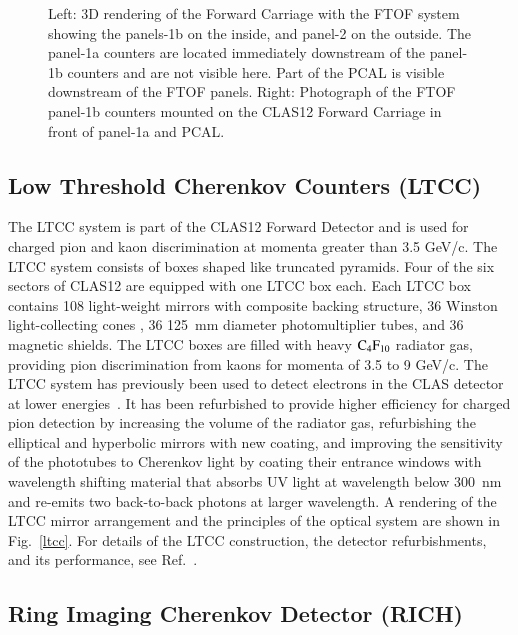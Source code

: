 \documentclass[final,3p,twocolumn]{elsarticle}
\begin{document}
\begin{figure}[htbp!]
\caption{Left: 3D rendering of the Forward Carriage with the FTOF system showing the panels-1b on the inside, and panel-2 on the outside. 
The panel-1a counters are located immediately downstream of the panel-1b counters and are not visible here. Part of the PCAL is 
visible downstream of the FTOF panels. 
Right: Photograph of the FTOF panel-1b counters mounted on the CLAS12 Forward Carriage in front of panel-1a and PCAL.} 
\label{ftof-1b}
\end{figure}



\subsection{\rm Low Threshold Cherenkov Counters (LTCC)}

The LTCC system is part of the CLAS12  Forward Detector and is used for charged pion and kaon discrimination 
at momenta greater than 3.5 GeV/c. The LTCC system consists of boxes shaped like truncated pyramids. Four 
of the six sectors of CLAS12 are equipped with one LTCC box each. Each LTCC box contains 108 light-weight 
mirrors with composite backing structure, 36 Winston light-collecting cones , 36 125~mm diameter photomultiplier tubes, and 36 
magnetic shields. The LTCC boxes are filled with heavy $\rm C_4F_{10}$ radiator gas, providing pion discrimination 
from kaons for momenta of 3.5 to 9 GeV/c.  The LTCC system has previously been used to detect electrons in the CLAS detector at lower 
energies~\cite{Adams:2001kk}. It has been refurbished to provide higher efficiency for charged pion detection by increasing the volume of 
the radiator gas, refurbishing the elliptical and hyperbolic mirrors with new coating, and improving the sensitivity of the phototubes to 
Cherenkov light by coating their entrance windows with wavelength shifting material that absorbs UV light at wavelength 
below 300~nm and re-emits two back-to-back photons at larger wavelength. A rendering of the LTCC mirror arrangement and the principles of the optical system are shown in Fig.~\ref{ltcc}.  For details of the LTCC construction, the detector refurbishments, and its performance, see Ref.~\cite{LTCC}.   

\subsection{\rm Ring Imaging Cherenkov Detector (RICH)} 
\end{document}
